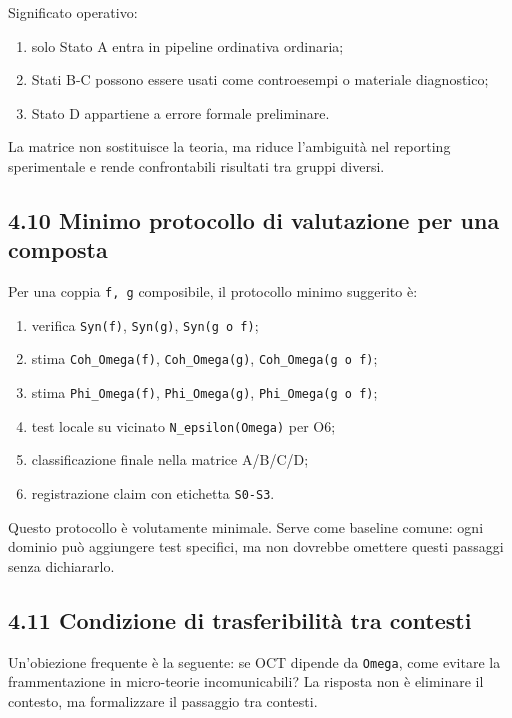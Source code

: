 Significato operativo:

\begin{enumerate}
\def\labelenumi{\arabic{enumi}.}
\tightlist
\item
  solo Stato A entra in pipeline ordinativa ordinaria;
\item
  Stati B-C possono essere usati come controesempi o materiale diagnostico;
\item
  Stato D appartiene a errore formale preliminare.
\end{enumerate}

La matrice non sostituisce la teoria, ma riduce l'ambiguità nel reporting sperimentale e rende confrontabili risultati tra gruppi diversi.

\subsection{4.10 Minimo protocollo di valutazione per una composta}

Per una coppia \texttt{f,\ g} composibile, il protocollo minimo suggerito è:

\begin{enumerate}
\def\labelenumi{\arabic{enumi}.}
\tightlist
\item
  verifica \texttt{Syn(f)}, \texttt{Syn(g)}, \texttt{Syn(g\ o\ f)};
\item
  stima \texttt{Coh\_Omega(f)}, \texttt{Coh\_Omega(g)}, \texttt{Coh\_Omega(g\ o\ f)};
\item
  stima \texttt{Phi\_Omega(f)}, \texttt{Phi\_Omega(g)}, \texttt{Phi\_Omega(g\ o\ f)};
\item
  test locale su vicinato \texttt{N\_epsilon(Omega)} per O6;
\item
  classificazione finale nella matrice A/B/C/D;
\item
  registrazione claim con etichetta \texttt{S0-S3}.
\end{enumerate}

Questo protocollo è volutamente minimale. Serve come baseline comune: ogni dominio può aggiungere test specifici, ma non dovrebbe omettere questi passaggi senza dichiararlo.

\subsection{4.11 Condizione di trasferibilità tra contesti}

Un'obiezione frequente è la seguente: se OCT dipende da \texttt{Omega}, come evitare la frammentazione in micro-teorie incomunicabili? La risposta non è eliminare il contesto, ma formalizzare il passaggio tra contesti.

